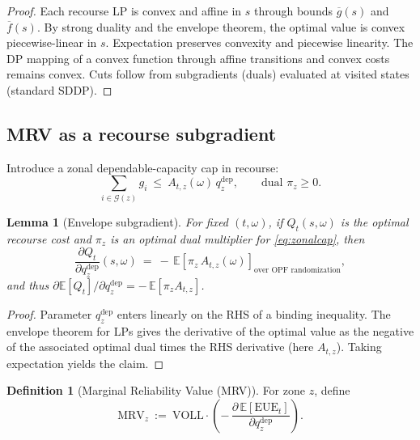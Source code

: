 \documentclass[11pt]{article}
\newcommand{\E}{\mathbb{E}}
\numberwithin{equation}{section}
\newtheorem{lemma}{Lemma}[section]
\theoremstyle{definition}
\newtheorem{definition}{Definition}[section]
\theoremstyle{remark}
\begin{document}
\begin{proof}
Each recourse LP is convex and affine in $s$ through bounds $\overline g(s)$ and $\overline f(s)$. By strong duality and the envelope theorem, the optimal value is convex piecewise-linear in $s$. Expectation preserves convexity and piecewise linearity. The DP mapping of a convex function through affine transitions and convex costs remains convex. Cuts follow from subgradients (duals) evaluated at visited states (standard SDDP). 
\end{proof}

\subsection{ MRV as a recourse subgradient}

Introduce a zonal dependable-capacity cap in recourse:
\begin{equation}\label{eq:zonalcap}
\sum_{i\in \mathcal G(z)} g_i \ \le\ A_{t,z}(\omega)\, q^{\mathrm{dep}}_{z},\qquad \text{dual } \pi_{z}\ge 0.
\end{equation}

\begin{lemma}[Envelope subgradient]\label{lem:envelope}
For fixed $(t,\omega)$, if $Q_t(s,\omega)$ is the optimal recourse cost and $\pi_{z}$ is an optimal dual multiplier for \eqref{eq:zonalcap}, then
\begin{equation}
\frac{\partial Q_t}{\partial q^{\mathrm{dep}}_{z}}(s,\omega) \ =\ -\,\E\!\left[\pi_{z}\,A_{t,z}(\omega)\right]_{\text{over OPF randomization}},
\end{equation}
and thus $\partial \E[Q_t]/\partial q^{\mathrm{dep}}_{z} = -\,\E[\pi_{z} A_{t,z}]$.
\end{lemma}

\begin{proof}
Parameter $q^{\mathrm{dep}}_{z}$ enters linearly on the RHS of a binding inequality. The envelope theorem for LPs gives the derivative of the optimal value as the negative of the associated optimal dual times the RHS derivative (here $A_{t,z}$). Taking expectation yields the claim.
\end{proof}

\begin{definition}[Marginal Reliability Value (MRV)]
For zone $z$, define
\begin{equation}
\mathrm{MRV}_{z}\ :=\ \mathrm{VOLL}\cdot\left(-\,\frac{\partial\,\E[\mathrm{EUE}_t]}{\partial q^{\mathrm{dep}}_{z}}\right).
\end{equation}
\end{definition}
\end{document}
